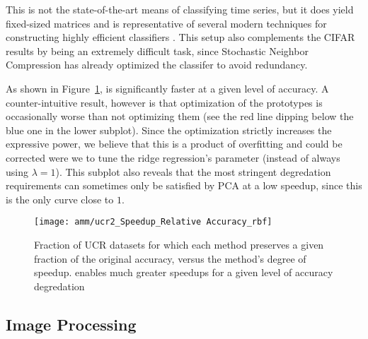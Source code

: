 This is not the state-of-the-art means of classifying time series, but it does yield fixed-sized matrices and is representative of several modern techniques for constructing highly efficient classifiers \cite{snc,dsnc,bnc,protonn}. This setup also complements the CIFAR results by being an extremely difficult task, since Stochastic Neighbor Compression has already optimized the classifer to avoid redundancy. %

As shown in Figure~\ref{fig:ucr}, \oursp is significantly faster at a given level of accuracy. A counter-intuitive result, however is that optimization of the prototypes is occasionally worse than not optimizing them (see the red line dipping below the blue one in the lower subplot). Since the optimization strictly increases the expressive power, we believe that this is a product of overfitting and could be corrected were we to tune the ridge regression's parameter (instead of always using $\lambda = 1$). This subplot also reveals that the most stringent degredation requirements can sometimes only be satisfied by PCA at a low speedup, since this is the only curve close to $1$.

\begin{figure}[h]
\begin{center}
\texttt{[image: amm/ucr2\_Speedup\_Relative Accuracy\_rbf]}
\caption{Fraction of UCR datasets for which each method preserves a given fraction of the original accuracy, versus the method's degree of speedup. \oursp enables much greater speedups for a given level of accuracy degredation}
\label{fig:ucr}
\end{center}
\end{figure}

\subsection{Image Processing}

